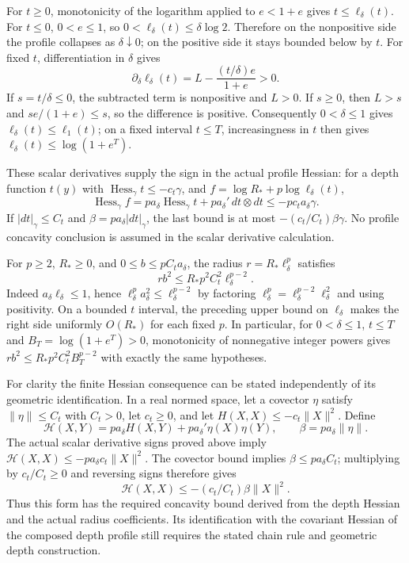 \documentclass[11pt]{article}
\theoremstyle{definition}
\theoremstyle{remark}
\numberwithin{equation}{section}
\begin{document}
For $t\ge0$, monotonicity of the logarithm applied to
$e<1+e$ gives $t\le\ell_\delta(t)$. For $t\le0$,
$0<e\le1$, so $0<\ell_\delta(t)\le\delta\log2$.
Therefore on the nonpositive side the profile collapses as $\delta\downarrow0$;
on the positive side it stays bounded below by $t$.
For fixed $t$, differentiation in $\delta$ gives
\[
 \partial_\delta\ell_\delta(t)
 =L-\frac{(t/\delta)e}{1+e}>0.
\]
If $s=t/\delta\le0$, the subtracted term is nonpositive and $L>0$.
If $s\ge0$, then $L>s$ and $se/(1+e)\le s$, so the difference is positive.
Consequently $0<\delta\le1$ gives
$\ell_\delta(t)\le\ell_1(t)$; on a fixed interval $t\le T$, increasingness
in $t$ then gives $\ell_\delta(t)\le\log(1+e^T)$.

These scalar derivatives supply the sign in the actual profile Hessian:
for a depth function $t(y)$ with $\operatorname{Hess}_\gamma t\le-c_t\gamma$,
and $f=\log R_*+p\log\ell_\delta(t)$,
\[
 \operatorname{Hess}_\gamma f
 =pa_\delta\operatorname{Hess}_\gamma t+
   pa_\delta'\,dt\otimes dt
 \le-pc_t a_\delta\gamma.
\]
If $|dt|_\gamma\le C_t$ and
$\beta=p a_\delta|dt|_\gamma$, the last bound is at most
$-(c_t/C_t)\beta\gamma$. No profile concavity conclusion is assumed in
the scalar derivative calculation.

For $p\ge2$, $R_*\ge0$, and $0\le b\le p C_t a_\delta$,
the radius $r=R_*\ell_\delta^p$ satisfies
\[
 rb^2\le R_*p^2 C_t^2\ell_\delta^{p-2}.
\]
Indeed $a_\delta\ell_\delta\le1$, hence
$\ell_\delta^p a_\delta^2\le\ell_\delta^{p-2}$ by factoring
$\ell_\delta^p=\ell_\delta^{p-2}\ell_\delta^2$ and using positivity.
On a bounded $t$ interval, the preceding upper bound on $\ell_\delta$ makes
the right side uniformly $O(R_*)$ for each fixed $p$.
In particular, for $0<\delta\le1$, $t\le T$ and
$B_T=\log(1+e^T)>0$, monotonicity of nonnegative integer powers gives
$rb^2\le R_*p^2C_t^2 B_T^{p-2}$ with exactly the same hypotheses.

For clarity the finite Hessian consequence can be stated independently of
its geometric identification. In a real normed space, let a covector $\eta$
satisfy $\|\eta\|\le C_t$ with $C_t>0$, let $c_t\ge0$,
and let $H(X,X)\le-c_t\|X\|^2$. Define
\[
 \mathcal H(X,Y)=p a_\delta H(X,Y)
       +p a_\delta'\eta(X)\eta(Y),\qquad
 \beta=p a_\delta\|\eta\|.
\]
The actual scalar derivative signs proved above imply
$\mathcal H(X,X)\le-p a_\delta c_t\|X\|^2$.
The covector bound implies $\beta\le p a_\delta C_t$; multiplying by
$c_t/C_t\ge0$ and reversing signs therefore gives
\[
 \mathcal H(X,X)\le-(c_t/C_t)\beta\|X\|^2.
\]
Thus this form has the required concavity bound derived from the depth
Hessian and the actual radius coefficients. Its identification with the
covariant Hessian of the composed depth profile still requires the stated
chain rule and geometric depth construction.
\end{document}
